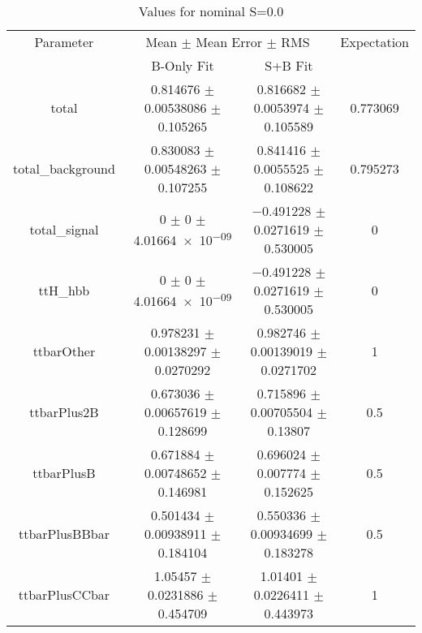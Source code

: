 \begin{table}
\centering
\caption{Values for nominal S=0.0}
\begin{tabular}{cccc}
\toprule
Parameter & \multicolumn{2}{c}{Mean $\pm$ Mean Error $\pm$ RMS} & Expectation\\
 & B-Only Fit & S+B Fit & \\
\midrule
total & \num{0.814676} $\pm$ \num{0.00538086} $\pm$ \num{0.105265} & \num{0.816682} $\pm$ \num{0.0053974} $\pm$ \num{0.105589} & \num{0.773069}\\
total\_background & \num{0.830083} $\pm$ \num{0.00548263} $\pm$ \num{0.107255} & \num{0.841416} $\pm$ \num{0.0055525} $\pm$ \num{0.108622} & \num{0.795273}\\
total\_signal & \num{0} $\pm$ \num{0} $\pm$ \num{4.01664e-09} & \num{-0.491228} $\pm$ \num{0.0271619} $\pm$ \num{0.530005} & \num{0}\\
ttH\_hbb & \num{0} $\pm$ \num{0} $\pm$ \num{4.01664e-09} & \num{-0.491228} $\pm$ \num{0.0271619} $\pm$ \num{0.530005} & \num{0}\\
ttbarOther & \num{0.978231} $\pm$ \num{0.00138297} $\pm$ \num{0.0270292} & \num{0.982746} $\pm$ \num{0.00139019} $\pm$ \num{0.0271702} & \num{1}\\
ttbarPlus2B & \num{0.673036} $\pm$ \num{0.00657619} $\pm$ \num{0.128699} & \num{0.715896} $\pm$ \num{0.00705504} $\pm$ \num{0.13807} & \num{0.5}\\
ttbarPlusB & \num{0.671884} $\pm$ \num{0.00748652} $\pm$ \num{0.146981} & \num{0.696024} $\pm$ \num{0.007774} $\pm$ \num{0.152625} & \num{0.5}\\
ttbarPlusBBbar & \num{0.501434} $\pm$ \num{0.00938911} $\pm$ \num{0.184104} & \num{0.550336} $\pm$ \num{0.00934699} $\pm$ \num{0.183278} & \num{0.5}\\
ttbarPlusCCbar & \num{1.05457} $\pm$ \num{0.0231886} $\pm$ \num{0.454709} & \num{1.01401} $\pm$ \num{0.0226411} $\pm$ \num{0.443973} & \num{1}\\
\bottomrule
\end{tabular}
\end{table}